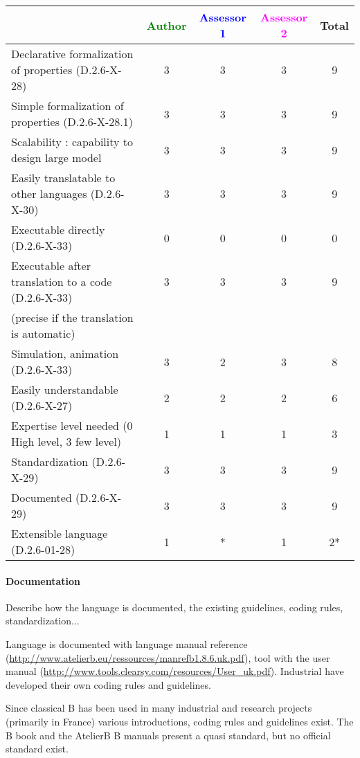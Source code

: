 \begin{tabular}{|l | c | c | c | c|}
\hline
& \textcolor{green}{Author} & \textcolor{blue}{Assessor 1} & \textcolor{magenta}{Assessor 2} & Total \\
\hline
Declarative formalization of properties (D.2.6-X-28) & 3 & 3 & 3 & 9 \\
\hline
Simple formalization of properties (D.2.6-X-28.1) & 3 & 3 & 3 & 9  \\
\hline
Scalability : capability to design large model & 3 & 3 & 3 & 9 \\
\hline
Easily translatable to other languages (D.2.6-X-30) & 3 & 3 & 3 & 9 \\
\hline
Executable directly (D.2.6-X-33) & 0 & 0 & 0 & 0 \\
\hline
Executable after translation to a code (D.2.6-X-33) & 3 & 3 & 3 & 9 \\
(precise if the translation is automatic) & & & & \\
\hline
Simulation, animation (D.2.6-X-33) &  3 & 2 & 3 & 8 \\
\hline
Easily understandable (D.2.6-X-27) & 2 & 2 & 2 & 6 \\
\hline
Expertise level needed (0 High level, 3 few level) &  1 & 1 & 1 & 3 \\
\hline
Standardization (D.2.6-X-29) & 3 & 3 & 3 & 9 \\
\hline
Documented (D.2.6-X-29) & 3 & 3 & 3 & 9 \\
\hline
Extensible language (D.2.6-01-28) & 1 & * & 1 & 2* \\
\hline
\end{tabular}


\paragraph{Documentation} Describe how the language is documented, the existing guidelines, coding rules, standardization...

\begin{author_comment}

Language is documented with language manual reference (\url{http://www.atelierb.eu/ressources/manrefb1.8.6.uk.pdf}), tool with the user manual (\url{http://www.tools.clearsy.com/resources/User_uk.pdf}). Industrial have developed their own coding rules and guidelines.
\end{author_comment}

\begin{assessor2}
Since classical B has been used in many industrial and research projects (primarily in France) various introductions, coding rules and guidelines exist. The B book and the AtelierB B manuals present a quasi standard, but no official standard exist.
\end{assessor2}

